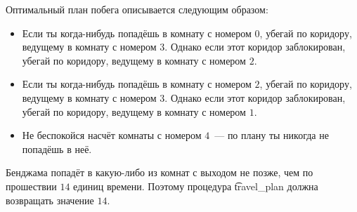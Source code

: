 Оптимальный план побега описывается следующим образом:

\begin{itemize}
\item Если ты когда-нибудь попадёшь в комнату с номером $0$, убегай по коридору, ведущему в комнату с номером $3$. Однако если этот коридор заблокирован, убегай по коридору, ведущему в комнату с номером $2$.
\item Если ты когда-нибудь попадёшь в комнату с номером $2$, убегай по коридору, ведущему в комнату с номером $3$. Однако если этот коридор заблокирован, убегай по коридору, ведущему в комнату с номером $1$.
\item Не беспокойся насчёт комнаты с номером $4$~--- по плану ты никогда не попадёшь в неё.
\end{itemize}

Бенджама попадёт в какую-либо из комнат с выходом не позже, чем по прошествии $14$ единиц времени. Поэтому процедура \t{travel\_plan} должна возвращать значение $14$.
